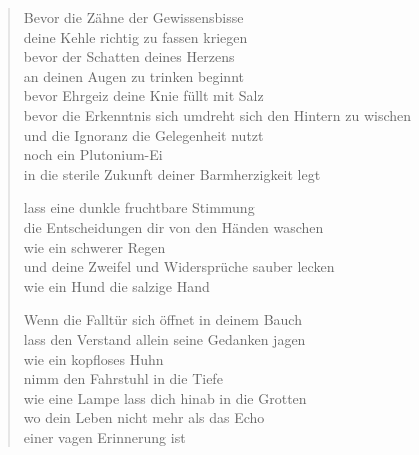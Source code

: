 

\cleartoverso


\begin{verse}

Bevor die Zähne der Gewissensbisse\\
deine Kehle richtig zu fassen kriegen\\
bevor der Schatten deines Herzens\\
an deinen Augen zu trinken beginnt\\
bevor Ehrgeiz deine Knie füllt mit Salz\\
bevor die Erkenntnis sich umdreht sich den Hintern zu wischen\\
und die Ignoranz die Gelegenheit nutzt\\
noch ein Plutonium-Ei\\
in die sterile Zukunft deiner Barmherzigkeit legt

lass eine dunkle fruchtbare Stimmung\\
die Entscheidungen dir von den Händen waschen\\
wie ein schwerer Regen\\
und deine Zweifel und Widersprüche sauber lecken\\
wie ein Hund die salzige Hand

Wenn die Falltür sich öffnet in deinem Bauch\\
lass den Verstand allein seine Gedanken jagen\\
wie ein kopfloses Huhn\\
nimm den Fahrstuhl in die Tiefe\\
wie eine Lampe lass dich hinab in die Grotten\\
wo dein Leben nicht mehr als das Echo\\
einer vagen Erinnerung ist
\end{verse}

\clearpage


